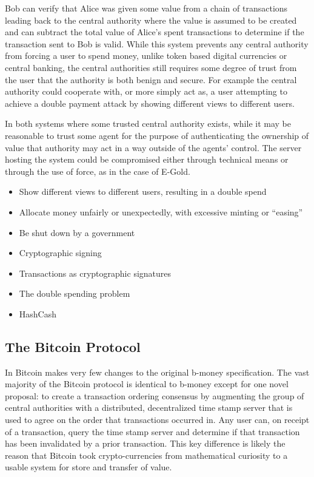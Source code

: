 Bob can verify that Alice was given some value from a chain of transactions
leading back to the central authority where the value is assumed to be created
and can subtract the total value of Alice's spent transactions to determine if
the transaction sent to Bob is valid.  While this system prevents any central
authority from forcing a user to spend money, unlike token based digital
currencies or central banking, the central authorities still requires some degree of trust from the user that the
authority is both benign and secure. For example the central authority could
cooperate with, or more simply act as, a user attempting to achieve a double
payment attack by showing different views to different users.

In both systems where some trusted central authority exists, while it may be reasonable to
trust some agent for the purpose of authenticating the ownership of value that
authority may act in a way outside of the agents' control.  The server hosting
the system could be compromised either through technical means or through the
use of force, as in the case of E-Gold.

\begin{itemize} \item Show different views to different users, resulting in a
        double spend \item Allocate money unfairly or unexpectedly, with
        excessive minting or ``easing'' \item Be shut down by a government \item
        Cryptographic signing \item Transactions as cryptographic signatures
        \item The double spending problem \item HashCash \end{itemize}

\subsection{The Bitcoin Protocol}
In Bitcoin \textcite{satoshi} makes very few changes to the original b-money\cite{b-money} specification.  The vast majority of the Bitcoin protocol is identical to b-money except for one novel proposal: to create a transaction ordering consensus by augmenting the group of central authorities with a
distributed, decentralized time stamp server that is used to agree on the
order that transactions occurred in.  Any user can, on receipt of a transaction,
query the time stamp server and determine if that transaction has been
invalidated by a prior transaction. This key difference is likely the reason that Bitcoin took crypto-currencies from mathematical curiosity to a usable system for store and transfer of value.

